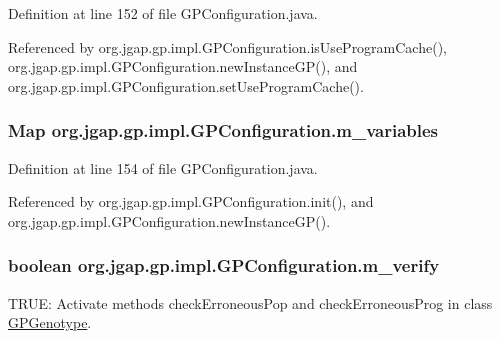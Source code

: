 Definition at line 152 of file G\-P\-Configuration.\-java.



Referenced by org.\-jgap.\-gp.\-impl.\-G\-P\-Configuration.\-is\-Use\-Program\-Cache(), org.\-jgap.\-gp.\-impl.\-G\-P\-Configuration.\-new\-Instance\-G\-P(), and org.\-jgap.\-gp.\-impl.\-G\-P\-Configuration.\-set\-Use\-Program\-Cache().

\hypertarget{classorg_1_1jgap_1_1gp_1_1impl_1_1_g_p_configuration_a952d6bdec1edf71e0ef1aabcb90d5494}{
\subsubsection[{m\-\_\-variables}]{\setlength{\rightskip}{0pt plus 5cm}Map org.\-jgap.\-gp.\-impl.\-G\-P\-Configuration.\-m\-\_\-variables\hspace{0.3cm}{\ttfamily [private]}}}\label{classorg_1_1jgap_1_1gp_1_1impl_1_1_g_p_configuration_a952d6bdec1edf71e0ef1aabcb90d5494}


Definition at line 154 of file G\-P\-Configuration.\-java.



Referenced by org.\-jgap.\-gp.\-impl.\-G\-P\-Configuration.\-init(), and org.\-jgap.\-gp.\-impl.\-G\-P\-Configuration.\-new\-Instance\-G\-P().

\hypertarget{classorg_1_1jgap_1_1gp_1_1impl_1_1_g_p_configuration_a9e44fa6879685cc29437c3adf4611d2e}{
\subsubsection[{m\-\_\-verify}]{\setlength{\rightskip}{0pt plus 5cm}boolean org.\-jgap.\-gp.\-impl.\-G\-P\-Configuration.\-m\-\_\-verify\hspace{0.3cm}{\ttfamily [private]}}}\label{classorg_1_1jgap_1_1gp_1_1impl_1_1_g_p_configuration_a9e44fa6879685cc29437c3adf4611d2e}
T\-R\-U\-E\-: Activate methods check\-Erroneous\-Pop and check\-Erroneous\-Prog in class \hyperlink{classorg_1_1jgap_1_1gp_1_1impl_1_1_g_p_genotype}{G\-P\-Genotype}. 

